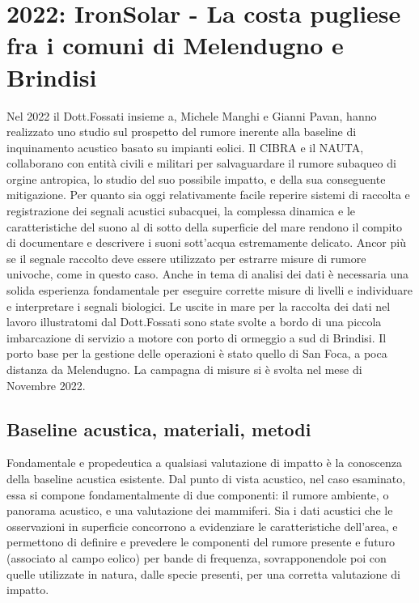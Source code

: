 \section{2022: IronSolar - La costa pugliese fra i comuni di Melendugno e Brindisi} 
Nel 2022 il Dott.Fossati insieme a, Michele Manghi e Gianni Pavan, hanno realizzato uno studio sul prospetto del rumore inerente alla baseline di inquinamento acustico basato su impianti eolici. 
Il CIBRA e il NAUTA, collaborano con entità civili e militari per salvaguardare il rumore subaqueo di orgine antropica, lo studio del suo possibile impatto, e della sua conseguente mitigazione. 
Per quanto sia oggi relativamente facile reperire sistemi di raccolta e registrazione dei segnali acustici subacquei, la complessa dinamica e le caratteristiche del suono al di sotto della superficie del mare rendono il compito di documentare e descrivere i suoni sott’acqua estremamente delicato. 
Ancor più se il segnale raccolto deve essere utilizzato per estrarre misure di rumore univoche, come in questo caso. 
Anche in tema di analisi dei dati è necessaria una solida esperienza fondamentale per eseguire corrette misure di livelli e individuare e interpretare i segnali biologici.
Le uscite in mare per la raccolta dei dati nel lavoro illustratomi dal Dott.Fossati sono state svolte a bordo di una piccola imbarcazione di servizio a motore con porto di ormeggio a sud di Brindisi. 
Il porto base per la gestione delle operazioni è stato quello di San Foca, a poca distanza da Melendugno. 
La campagna di misure si è svolta nel mese di Novembre 2022. 

\subsection{Baseline acustica, materiali, metodi} 
Fondamentale e propedeutica a qualsiasi valutazione di impatto è la conoscenza della baseline acustica esistente. 
Dal punto di vista acustico, nel caso esaminato, essa si compone fondamentalmente di due componenti: il rumore ambiente, o panorama acustico, e una valutazione dei mammiferi. 
Sia i dati acustici che le osservazioni in superficie concorrono a evidenziare le caratteristiche dell’area, e permettono di definire e prevedere le componenti del rumore presente e futuro (associato al campo eolico) per bande di frequenza, 
sovrapponendole poi con quelle utilizzate in natura, dalle specie presenti, per una corretta valutazione di impatto. 

